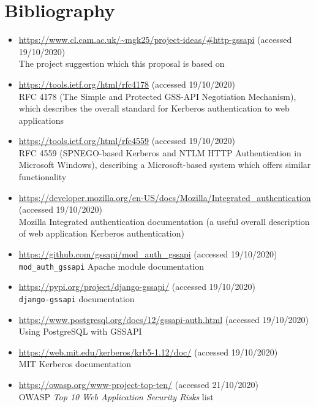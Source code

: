 \documentclass{article}
\begin{document}
\section*{Bibliography}
\begin{itemize}
\item \url{https://www.cl.cam.ac.uk/~mgk25/project-ideas/#http-gssapi} (accessed 19/10/2020) \\ The project suggestion which this proposal is based on
\item \url{https://tools.ietf.org/html/rfc4178} (accessed 19/10/2020) \\ RFC 4178 (The Simple and Protected GSS-API Negotiation Mechanism), which describes the overall standard for Kerberos authentication to web applications
\item \url{https://tools.ietf.org/html/rfc4559} (accessed 19/10/2020) \\ RFC 4559 (SPNEGO-based Kerberos and NTLM HTTP Authentication in Microsoft Windows), describing a Microsoft-based system which offers similar functionality
\item \url{https://developer.mozilla.org/en-US/docs/Mozilla/Integrated_authentication} (accessed 19/10/2020) \\ Mozilla Integrated authentication documentation (a useful overall description of web application Kerberos authentication)
\item \url{https://github.com/gssapi/mod_auth_gssapi} (accessed 19/10/2020) \\ \verb+mod_auth_gssapi+ Apache module documentation
\item \url{https://pypi.org/project/django-gssapi/} (accessed 19/10/2020)  \\ \verb+django-gssapi+ documentation
\item \url{https://www.postgresql.org/docs/12/gssapi-auth.html} (accessed 19/10/2020) \\ Using PostgreSQL with GSSAPI
\item \url{https://web.mit.edu/kerberos/krb5-1.12/doc/} (accessed 19/10/2020) \\ MIT Kerberos documentation
\item \url{https://owasp.org/www-project-top-ten/} (accessed 21/10/2020) \\  OWASP \textit{Top 10 Web Application Security Risks} list
\end{itemize}
\end{document}
